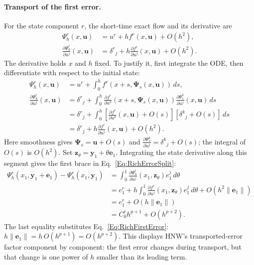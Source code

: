 \paragraph{Transport of the first error.}
For the state component $r$, the short-time exact flow and its derivative are
\begin{equation}\label{Eq:RichFlowDerivative}
\begin{aligned}
 \Psi_h^r(x,\mathbf u)&=u^r+h f^r(x,\mathbf u)+O(h^2),\\
 \frac{\partial\Psi_h^r}{\partial u^j}(x,\mathbf u)
 &=\delta^r{}_j+h\frac{\partial f^r}{\partial u^j}(x,\mathbf u)+O(h^2).
\end{aligned}
\end{equation}
The derivative holds $x$ and $h$ fixed. To justify it, first integrate the ODE,
then differentiate with respect to the initial state:
\begin{align*}
 \Psi_h^r(x,\mathbf u)
 &=u^r+\int_0^h f^r(x+s,\boldsymbol\Psi_s(x,\mathbf u))\,ds,\\
 \frac{\partial\Psi_h^r}{\partial u^j}(x,\mathbf u)
 &=\delta^r{}_j+\int_0^h
 \frac{\partial f^r}{\partial u^k}(x+s,\boldsymbol\Psi_s(x,\mathbf u))
 \frac{\partial\Psi_s^k}{\partial u^j}(x,\mathbf u)\,ds\\
 &=\delta^r{}_j+\int_0^h\left[
 \frac{\partial f^r}{\partial u^k}(x,\mathbf u)+O(s)\right]
 [\delta^k{}_j+O(s)]\,ds\\
 &=\delta^r{}_j+h\frac{\partial f^r}{\partial u^j}(x,\mathbf u)+O(h^2).
\end{align*}
Here smoothness gives $\boldsymbol\Psi_s=\mathbf u+O(s)$ and
$\frac{\partial\Psi_s^k}{\partial u^j}=\delta^k{}_j+O(s)$; the integral of $O(s)$
is $O(h^2)$. Set
$\mathbf z_\theta=\mathbf y_1+\theta\mathbf e_1$. Integrating the state derivative
along this segment gives the first brace in Eq.~\ref{Eq:RichErrorSplit}:
\begin{align}
 \Psi_h^r(x_1,\mathbf y_1+\mathbf e_1)-\Psi_h^r(x_1,\mathbf y_1)
 &=\int_0^1\frac{\partial\Psi_h^r}{\partial u^j}
       (x_1,\mathbf z_\theta)e_1^j\,d\theta\nonumber\\
 &=e_1^r+h\int_0^1\frac{\partial f^r}{\partial u^j}
       (x_1,\mathbf z_\theta)e_1^j\,d\theta
       +O(h^2\|\mathbf e_1\|)\nonumber\\
 &=e_1^r+O(h\|\mathbf e_1\|)\nonumber\\
 &=C_0^r h^{p+1}+O(h^{p+2}).\label{Eq:RichTransport}
\end{align}
The last equality substitutes Eq.~\ref{Eq:RichFirstError}:
$h\|\mathbf e_1\|=h\,O(h^{p+1})=O(h^{p+2})$.
This displays HNW's transported-error factor component by component:
the first error changes during transport, but that change is one power of $h$
smaller than its leading term.

